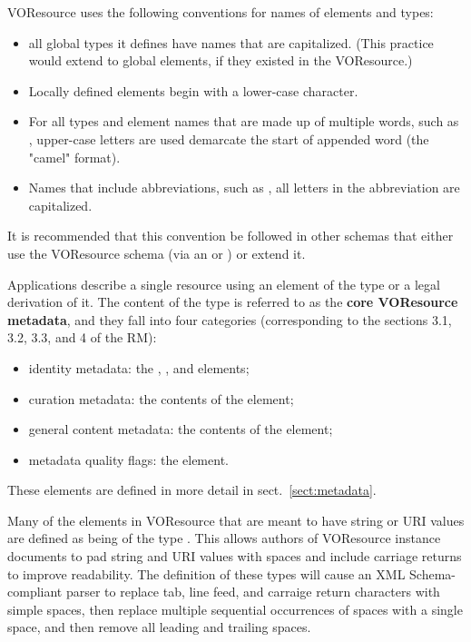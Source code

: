 \documentclass[11pt,a4paper]{ivoa}
\begin{document}

VOResource uses the following conventions for
names of elements and types:

\begin{itemize}
  \item all global types it defines have names that are capitalized.
       (This practice would extend to global elements, if they existed
       in the VOResource.)   
  \item Locally defined elements begin with a lower-case character. 
  \item For all types and element names that are made up of multiple
       words, such as , upper-case letters are
       used demarcate the start of appended word (the "camel"
       format).  
  \item Names that include abbreviations, such as
       , all letters in the abbreviation are
       capitalized.  
\end{itemize}

It is recommended that this convention be followed in other schemas
that either use the VOResource schema (via an  or
) or extend it.  

Applications describe a single resource using an element of the type
 or a legal derivation of it.  The content of the
 type is referred to as the \textbf{core VOResource
metadata}, and they fall into four categories (corresponding to the
sections 3.1, 3.2, 3.3, and 4 of the RM):

\begin{itemize}
  \item identity metadata:  the ,
       , and
        elements;
  \item curation metadata:  the contents of the
        element;
  \item general content metadata:  the contents of the
        element;
  \item metadata quality flags:  the
        element.
\end{itemize}


These elements are defined in more detail in sect.~\ref{sect:metadata}.



Many of the elements in VOResource that are meant to have string or
URI values are defined as being of the type .
This allows authors of VOResource instance documents to pad string and
URI values with spaces and include carriage returns to improve
readability.  The definition of these types will cause an XML
Schema-compliant parser to replace tab, line feed, and carraige return
characters with simple spaces, then replace multiple sequential
occurrences of spaces with a single space, and then remove all leading
and trailing spaces.  
\end{document}
